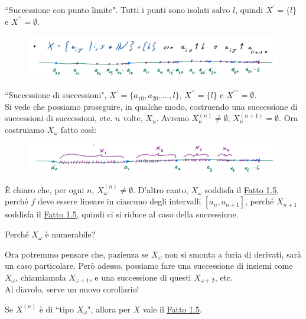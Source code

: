``Successione con punto limite". Tutti i punti sono isolati salvo $l$, quindi $X^{\prime} = \{l\}$ e $X^{\prime\prime} = \emptyset$.

\begin{figure}[H]
	\centering
	\includegraphics[scale = 0.3]{immagini/es3.png}
\end{figure}

``Successione di successioni", $X^{\prime} = \{a_{10}, a_{20}, \ldots, l\}$, $X^{\prime\prime} = \{l\}$ e $X^{\prime\prime\prime} = \emptyset$.\\
Si vede che possiamo proseguire, in qualche modo, costruendo una successione di successioni di successioni, etc. $n$ volte, $X_n$. Avremo $X_n^{(n)} \ne \emptyset$, $X_n^{(n+1)} = \emptyset$. Ora costruiamo 
$X_{\omega}$ fatto così:

\begin{figure}[H]
	\centering
	\includegraphics[scale = 0.3]{immagini/esomega.png}
\end{figure}

È chiaro che, per ogni $n$, $X_\omega^{(n)} \ne \emptyset$. D'altro canto, $X_\omega$ soddisfa il \hyperref[unicità]{Fatto 1.5}, perché $f$ deve essere lineare in ciascuno degli intervalli
$[a_n,a_{n+1}]$, perché $X_{n+1}$ soddisfa il \hyperref[unicità]{Fatto 1.5}, quindi ci si riduce al caso della successione.

\begin{exercise}
Perché $X_\omega$ è numerabile?
\end{exercise}

Ora potremmo pensare che, pazienza se $X_\omega$ non si smonta a furia di derivati, sarà un caso particolare. Però adesso, possiamo fare una successione di insiemi come $X_\omega$, chiamiamola $X_{\omega+1}$, e 
una successione di questi $X_{\omega+2}$, etc.\\
Al diavolo, serve un nuovo corollario!

\begin{corollary}
Se $X^{(n)}$ è di ``tipo $X_\omega$", allora per $X$ vale il \hyperref[unicità]{Fatto 1.5}.
\end{corollary}

